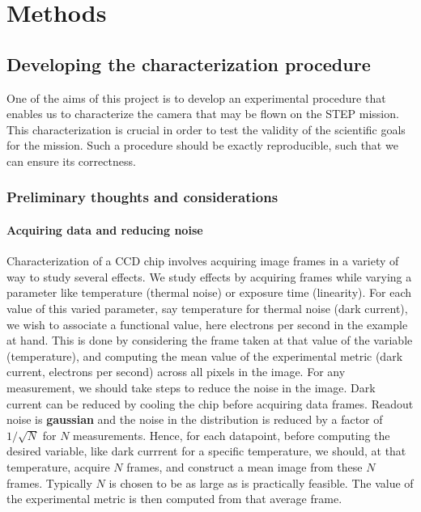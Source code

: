 \documentclass[../main.tex]{subfiles}
\begin{document}
	
	\chapter{Methods}
		\section{Developing the characterization procedure}
		One of the aims of this project is to develop an experimental procedure that enables us to characterize the camera that may be flown on the STEP mission. This characterization is crucial in order to test the validity of the scientific goals for the mission. Such a procedure should be exactly reproducible, such that we can ensure its correctness.
	
		\subsection{Preliminary thoughts and considerations}
		\subsubsection{Acquiring data and reducing noise}
		Characterization of a CCD chip involves acquiring image frames in a variety of way to study several effects. We study effects by acquiring frames while varying a parameter like temperature (thermal noise) or exposure time (linearity). For each value of this varied parameter, say temperature for thermal noise (dark current), we wish to associate a functional value, here electrons per second in the example at hand. This is done by considering the frame taken at that value of the variable (temperature), and computing the mean value of the experimental metric (dark current, electrons per second) across all pixels in the image. For any measurement, we should take steps to reduce the noise in the image. Dark current can be reduced by cooling the chip before acquiring data frames. Readout noise is \textbf{gaussian} and the noise in the distribution is reduced by a factor of $1/\sqrt{N}$ for $N$ measurements. Hence, for each datapoint, before computing the desired variable, like dark currrent for a specific temperature, we should, at that temperature, acquire $N$ frames, and construct a mean image from these $N$ frames. Typically $N$ is chosen to be as large as is practically feasible. The value of the experimental metric is then computed from that average frame. 
	
\end{document}
